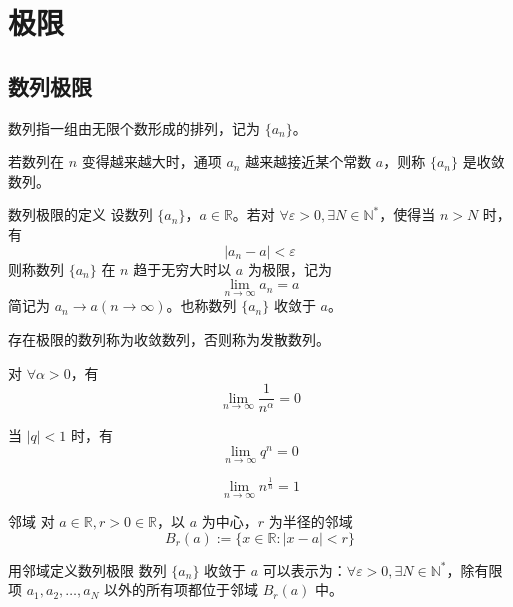 \chapter{极限}


\section{数列极限}

数列指一组由无限个数形成的排列，记为 $\{a_n\}$。

若数列在 $n$ 变得越来越大时，通项 $a_n$ 越来越接近某个常数 $a$，则称 $\{a_n\}$ 是收敛数列。

\begin{definition}{数列极限的定义}
    设数列 $\{a_n\}$，$a \in \mathbb{R}$。若对 $\forall \varepsilon > 0, \exists N \in \mathbb{N}^*$，使得当 $n > N$ 时，有
    \[|a_n - a| < \varepsilon\]
    则称数列 $\{a_n\}$ 在 $n$ 趋于无穷大时以 $a$ 为极限，记为
    \[\lim_{n \to \infty} a_n = a\]
    简记为 $a_n \to a(n \to \infty)$。也称数列 $\{a_n\}$ 收敛于 $a$。

    存在极限的数列称为收敛数列，否则称为发散数列。
\end{definition}

\hfill

\begin{example}
    对 $\forall \alpha > 0$，有
    \[\lim_{n \to \infty}\frac{1}{n^{\alpha}} = 0\]
\end{example}

\hfill

\begin{example}
    当 $|q| < 1$ 时，有
    \[\lim_{n \to \infty}q^n = 0\]
\end{example}

\hfill

\begin{example}
    \[\lim_{n \to \infty}n^{\frac{1}{n}} = 1\]
\end{example}

\hfill

\begin{definition}{邻域}
    对 $a \in \mathbb{R}, r > 0 \in \mathbb{R}$，以 $a$ 为中心，$r$ 为半径的邻域
    \[B_r(a) := \{ x \in \mathbb{R} : |x - a| < r\}\]
\end{definition}

\begin{definition}{用邻域定义数列极限}
    数列 $\{a_n\}$ 收敛于 $a$ 可以表示为：$\forall \varepsilon > 0,\exists N \in \mathbb{N}^*$，除有限项 $a_1,a_2, \ldots ,a_N$ 以外的所有项都位于邻域 $B_r(a)$ 中。
\end{definition}

